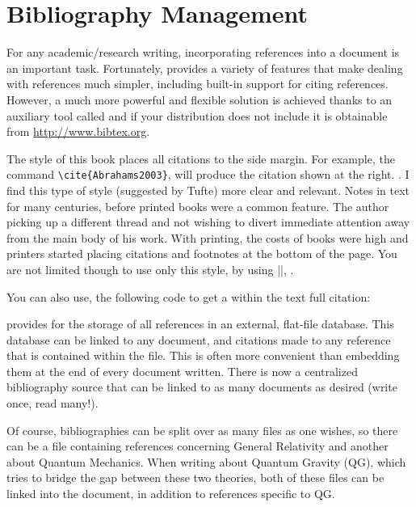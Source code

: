 \chapter{Bibliography Management}         

For any academic/research writing, incorporating references into a document is an important task. Fortunately, \latex provides  a variety of features that make dealing with references much simpler, including built-in support for citing references. However, a much more powerful and flexible solution is achieved thanks to an auxiliary tool called \bibtex and if your \latex  distribution does not include it is obtainable from \url{http://www.bibtex.org}.


The style of this book places all citations to the side margin. For example, the command  \verb+\cite{Abrahams2003}+, will produce the citation shown at the right. \cite{Abrahams2003}. I find this type of style (suggested by Tufte) more clear and relevant. Notes in text for many centuries, before printed books were a common feature. The author picking up a different thread and not wishing to divert immediate attention away from the main body of his work. With printing, the costs of books were high and printers started placing citations and footnotes at the bottom of the page. You are not limited though to use only this style, by using |\cite{Bringhurst2005}|, \citet{Bringhurst2005}.

You can also use, the following code to get a within the text full citation:

\begin{teX}
\end{teX}
\begin{quote}
\end{quote}

\bibtex provides for the storage of all references in an external, flat-file database. This database can be linked to any \latex document, and citations made to any reference that is contained within the file. This is often more convenient than embedding them at the end of every document written. There is now a centralized bibliography source that can be linked to as many documents as desired (write once, read many!). 

Of course, bibliographies can be split over as many files as one wishes, so there can be a file containing references concerning General Relativity and another about Quantum Mechanics. When writing about Quantum Gravity (QG), which tries to bridge the gap between these two theories, both of these files can be linked into the document, in addition to references specific to QG.

